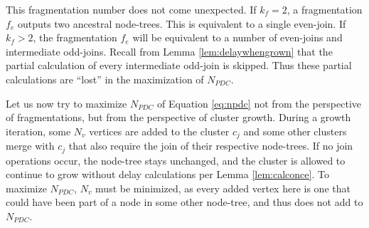 This fragmentation number does not come unexpected. If $k_f=2$, a fragmentation $f_e$ outputs two ancestral node-trees. This is equivalent to a single even-join. If $k_f>2$, the fragmentation $f_e$ will be equivalent to a number of even-joins and intermediate odd-joins. Recall from Lemma \ref{lem:delaywhengrown} that the partial calculation of every intermediate odd-join is skipped. Thus these partial calculations are ``lost'' in the maximization of $N_{PDC}$. 

Let us now try to maximize $N_{PDC}$ of Equation \eqref{eq:npdc} not from the perspective of fragmentations, but from the perspective of cluster growth. During a growth iteration, some $N_v$ vertices are added to the cluster $c_j$ and some other clusters merge with $c_j$ that also require the join of their respective node-trees. If no join operations occur, the node-tree stays unchanged, and the cluster is allowed to continue to grow without delay calculations per Lemma \ref{lem:calconce}. To maximize $N_{PDC}$, $N_v$ must be minimized, as every added vertex here is one that could have been part of a node in some other node-tree, and thus does not add to $N_{PDC}$. 

